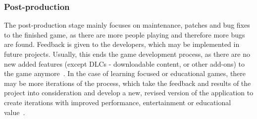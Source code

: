 \subsubsection{Post-production}\label{subsubsec:post-production}
The post-production stage mainly focuses on maintenance, patches and bug fixes to the finished game, as there are more people playing and therefore more bugs
are found.
Feedback is given to the developers, which may be implemented in future projects.
Usually, this ends the game development process, as there are no new added features (except DLCs - downloadable content, or other add-ons) to the game anymore~\cite{cg:game-design-stages}.
In the case of learning focused or educational games, there may be more iterations of the process, which take the feedback and results of the project into
consideration and develop a new, revised version of the application to create iterations with improved performance, entertainment or educational value~\cite{GAMED,10.5555/2544002}.

